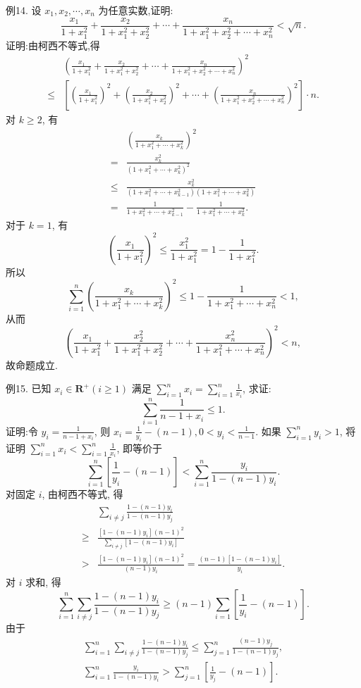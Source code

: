 例14. 设 $x_1, x_2, \cdots, x_n$ 为任意实数,证明:
$$
\frac{x_1}{1+x_1^2}+\frac{x_2}{1+x_1^2+x_2^2}+\cdots+\frac{x_n}{1+x_1^2+x_2^2+\cdots+x_n^2}<\sqrt{n} .
$$
证明:由柯西不等式,得
$$
\begin{aligned}
& \left(\frac{x_1}{1+x_1^2}+\frac{x_2}{1+x_1^2+x_2^2}+\cdots+\frac{x_n}{1+x_1^2+x_2^2+\cdots+x_n^2}\right)^2 \\
\leqslant & {\left[\left(\frac{x_1}{1+x_1^2}\right)^2+\left(\frac{x_2}{1+x_1^2+x_2^2}\right)^2+\cdots+\left(\frac{x_n}{1+x_1^2+x_2^2+\cdots+x_n^2}\right)^2\right] \cdot n . }
\end{aligned}
$$
对 $k \geqslant 2$, 有
$$
\begin{aligned}
& \left(\frac{x_k}{1+x_1^2+\cdots+x_k^2}\right)^2 \\
= & \frac{x_k^2}{\left(1+x_1^2+\cdots+x_k^2\right)^2} \\
\leqslant & \frac{x_k^2}{\left(1+x_1^2+\cdots+x_{k-1}^2\right)\left(1+x_1^2+\cdots+x_k^2\right)} \\
= & \frac{1}{1+x_1^2+\cdots+x_{k-1}^2}-\frac{1}{1+x_1^2+\cdots+x_k^2} .
\end{aligned}
$$
对于 $k=1$, 有
$$
\left(\frac{x_1}{1+x_1^2}\right)^2 \leqslant \frac{x_1^2}{1+x_1^2}=1-\frac{1}{1+x_1^2} .
$$
所以
$$
\sum_{i=1}^n\left(\frac{x_k}{1+x_1^2+\cdots+x_k^2}\right)^2 \leqslant 1-\frac{1}{1+x_1^2+\cdots+x_n^2}<1,
$$
从而
$$
\left(\frac{x_1}{1+x_1^2}+\frac{x_2^2}{1+x_1^2+x_2^2}+\cdots+\frac{x_n^2}{1+x_1^2+\cdots+x_n^2}\right)^2<n,
$$
故命题成立.



例15. 已知 $x_i \in \mathbf{R}^{+}(i \geqslant 1)$ 满足 $\sum_{i=1}^n x_i=\sum_{i=1}^n \frac{1}{x_i}$, 求证:
$$
\sum_{i=1}^n \frac{1}{n-1+x_i} \leqslant 1 .
$$
证明:令 $y_i=\frac{1}{n-1+x_i}$, 则 $x_i=\frac{1}{y_i}-(n-1), 0<y_i<\frac{1}{n-1}$.
如果 $\sum_{i=1}^n y_i>1$, 将证明 $\sum_{i=1}^n x_i<\sum_{i=1}^n \frac{1}{x_i}$, 即等价于
$$
\sum_{i=1}^n\left[\frac{1}{y_i}-(n-1)\right]<\sum_{i=1}^n \frac{y_i}{1-(n-1) y_i} .
$$
对固定 $i$, 由柯西不等式, 得
$$
\begin{aligned}
& \sum_{i \neq j} \frac{1-(n-1) y_i}{1-(n-1) y_j} \\
\geqslant & \frac{\left[1-(n-1) y_i\right](n-1)^2}{\sum_{i \neq j}\left[1-(n-1) y_i\right]} \\
> & \frac{\left[1-(n-1) y_i\right](n-1)^2}{(n-1) y_i}=\frac{(n-1)\left[1-(n-1) y_i\right]}{y_i} .
\end{aligned}
$$
对 $i$ 求和, 得
$$
\sum_{i=1}^n \sum_{i \neq j} \frac{1-(n-1) y_i}{1-(n-1) y_j} \geqslant(n-1) \sum_{i=1}\left[\frac{1}{y_i}-(n-1)\right] .
$$
由于
$$
\begin{gathered}
\sum_{i=1}^n \sum_{i \neq j} \frac{1-(n-1) y_i}{1-(n-1) y_j} \leqslant \sum_{j=1}^n \frac{(n-1) y_j}{1-(n-1) y_j}, \\
\sum_{i=1}^n \frac{y_i}{1-(n-1) y_i}>\sum_{j=1}^n\left[\frac{1}{y_j}-(n-1)\right] .
\end{gathered}
$$


